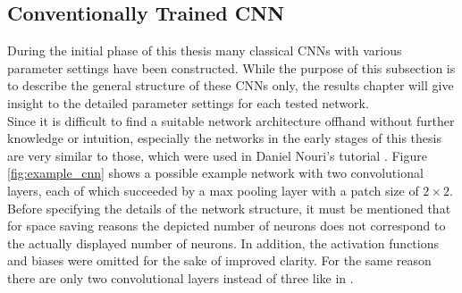 \documentclass[11pt, a4paper]{article}
\begin{document}
\subsection{Conventionally Trained CNN}
\label{subsec:conventiallytrainedcnn}

During the initial phase of this thesis many classical \acp{CNN} with various parameter settings have been constructed. While the purpose of this subsection is to describe the general structure of these \acp{CNN} only, the results chapter will give insight to the detailed para\-meter settings for each tested network.\\
Since it is difficult to find a suitable network architecture offhand without further knowledge or intuition, especially the networks in the early stages of this thesis are very similar to those, which were used in Daniel Nouri's tutorial \cite{nouri-tutorial}. Figure \ref{fig:example_cnn} shows a possible example network with two convolutional layers, each of which succeeded by a max pooling layer with a patch size of $2\times 2$. Before specifying the details of the network structure, it must be mentioned that for space saving reasons the depicted number of neurons does not correspond to the actually displayed number of neurons. In addition, the activation functions and biases were omitted for the sake of improved clarity. For the same reason there are only two convolutional layers instead of three like in \cite{nouri-tutorial}.
\\
\end{document}
